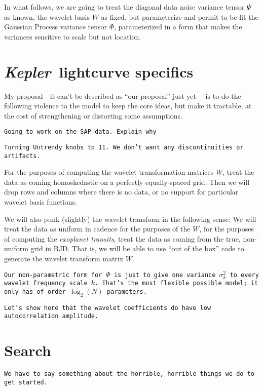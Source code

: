 \documentclass[12pt,letterpaper]{article}
\newcommand{\warning}[1]{\texttt{#1}}
\newcommand{\project}[1]{\textsl{#1}}
\newcommand{\Kepler}{\project{Kepler}}
\newcommand{\variance}{\sigma^2}
\newcommand{\noisetensor}{\Psi}
\newcommand{\wavetensor}{\Phi}
\newcommand{\weightmatrix}{W}
\begin{document}
In what follows,
we are going to treat the diagonal data noise variance tensor $\noisetensor$ as known,
the wavelet basis $\weightmatrix$ as fixed,
but parameterize and permit to be fit the Gaussian Process variance tensor $\wavetensor$,
parameterized in a form that makes the variances sensitive to scale but not location.

\section{\Kepler\ lightcurve specifics}

My proposal---it can't be described as ``our proposal'' just yet---%
is to do the following violence to the model to keep the core ideas,
but make it tractable, at the cost of strengthening or distorting some assumptions.

\warning{Going to work on the SAP data.
         Explain why}

\warning{Turning Untrendy knobs to 11.
         We don't want any discontinuities or artifacts.}

For the purposes of computing the wavelet transformation matrices $\weightmatrix$,
treat the data as coming homoskedastic on a perfectly equally-spaced grid.
Then we will drop rows and columns where there is no data,
or no support for particular wavelet basis functions.

We will also punk (slightly) the wavelet transform in the following sense:
We will treat the data as uniform in cadence for the purposes
of the $\weightmatrix$, for the purposes of computing the \emph{exoplanet transits},
treat the data as coming from the true, non-uniform grid in BJD.
That is, we will be able to use ``out of the box'' code to generate the wavelet transform
matrix $\weightmatrix$.

\warning{Our non-parametric form for $\wavetensor$ is just to give one variance $\variance_k$
         to every wavelet frequency scale $k$.
         That's the most flexible possible model;
         it only has of order $\log_2(N)$ parameters.}

\warning{Let's show here that the wavelet coefficients do have low autocorrelation amplitude.}

\section{Search}

\warning{We have to say something about the horrible, horrible things we do to get started.}
\end{document}
